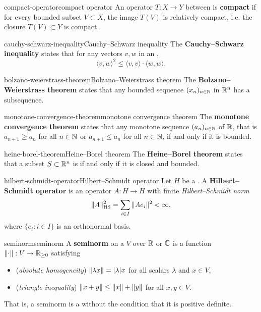 \begin{topic}{compact-operator}{compact operator}
    An operator $T : X \to Y$ between   is \textbf{compact} if for every bounded subset $V \subset X$, the image $T(V)$ is relatively compact, i.e. the closure $\overline{T(V)} \subset Y$ is compact.
\end{topic}

\begin{topic}{cauchy-schwarz-inequality}{Cauchy--Schwarz inequality}
    The \textbf{Cauchy--Schwarz inequality} states that for any vectors $v, w$ in an ,
    \[ \langle v, w \rangle^2 \le \langle v, v \rangle \cdot \langle w, w \rangle . \]
\end{topic}

\begin{topic}{bolzano-weierstrass-theorem}{Bolzano--Weierstrass theorem}
    The \textbf{Bolzano--Weierstrass theorem} states that any bounded sequence $(x_n)_{n \in \mathbb{N}}$ in $\mathbb{R}^n$ has a  subsequence.
\end{topic}

\begin{topic}{monotone-convergence-theorem}{monotone convergence theorem}
    The \textbf{monotone convergence theorem} states that any monotone sequence $(a_n)_{n \in \mathbb{N}}$ of $\mathbb{R}$, that is $a_{n + 1} \ge a_n$ for all $n \in \mathbb{N}$ or $a_{n + 1} \le a_n$ for all $n \in \mathbb{N}$,  if and only if it is bounded.
\end{topic}

\begin{topic}{heine-borel-theorem}{Heine--Borel theorem}
    The \textbf{Heine--Borel theorem} states that a subset $S \subset \mathbb{R}^n$ is  if and only if it is closed and bounded.
\end{topic}

\begin{topic}{hilbert-schmidt-operator}{Hilbert--Schmidt operator}
    Let $H$ be a . A \textbf{Hilbert--Schmidt operator} is an operator $A : H \to H$ with finite \textit{Hilbert--Schmidt norm}
    \[ \|A\|_\textup{HS}^2 = \sum_{i \in I} \|A e_i\|^2 < \infty , \]
    where $\{ e_i : i \in I \}$ is an orthonormal basis.
\end{topic}

\begin{topic}{seminorm}{seminorm}
    A \textbf{seminorm} on a  $V$ over $\mathbb{R}$ or $\mathbb{C}$ is a function $\left\|\cdot\right\| : V \to \mathbb{R}_{\ge 0}$ satisfying
    \begin{itemize}
        \item (\textit{absolute homogeneity}) $\left\|\lambda x\right\| = |\lambda| x$ for all scalars $\lambda$ and $x \in V$,
        \item (\textit{triangle inequality}) $\left\|x + y\right\| \le \left\|x\right\| + \left\|y\right\|$ for all $x, y \in V$.
    \end{itemize}
    That is, a seminorm is a  without the condition that it is positive definite.
\end{topic}

